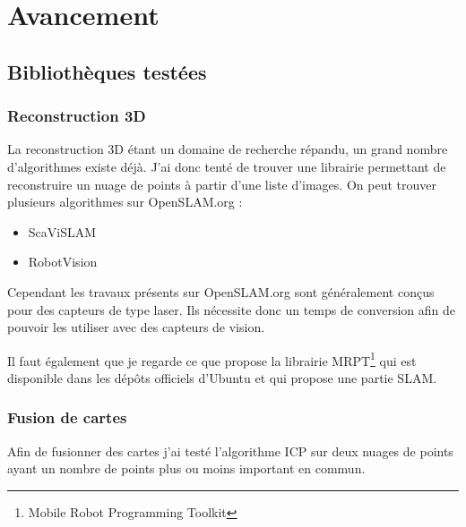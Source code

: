 \section{Avancement}

\subsection{Bibliothèques testées}

\subsubsection{Reconstruction 3D}

La reconstruction 3D étant un domaine de recherche répandu, un grand nombre d'algorithmes existe déjà. J'ai donc tenté de trouver une librairie permettant de reconstruire un nuage de points à partir d'une liste d'images.
On peut trouver plusieurs algorithmes sur OpenSLAM.org :
\begin{itemize}
  \item ScaViSLAM
  \item RobotVision
\end{itemize}

Cependant les travaux présents sur OpenSLAM.org sont généralement conçus pour des capteurs de type laser. Ils nécessite donc un temps de conversion afin de pouvoir les utiliser avec des capteurs de vision.

Il faut également que je regarde ce que propose la librairie MRPT\footnote{Mobile Robot Programming Toolkit} qui est disponible dans les dépôts officiels d'Ubuntu et qui propose une partie SLAM.

\subsubsection{Fusion de cartes}

Afin de fusionner des cartes j'ai testé l'algorithme ICP sur deux nuages de points ayant un nombre de points plus ou moins important en commun.

